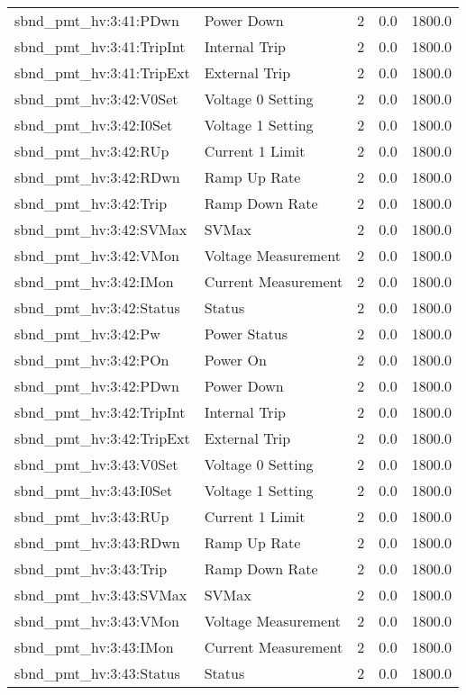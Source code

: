 \begin{center}
\begin{longtable}{l | l l l l }
sbnd\_pmt\_hv:3:41:PDwn & Power Down & 2 & 0.0 & 1800.0\\ 
sbnd\_pmt\_hv:3:41:TripInt & Internal Trip & 2 & 0.0 & 1800.0\\ 
sbnd\_pmt\_hv:3:41:TripExt & External Trip & 2 & 0.0 & 1800.0\\ 
sbnd\_pmt\_hv:3:42:V0Set & Voltage 0 Setting & 2 & 0.0 & 1800.0\\ 
sbnd\_pmt\_hv:3:42:I0Set & Voltage 1 Setting & 2 & 0.0 & 1800.0\\ 
sbnd\_pmt\_hv:3:42:RUp & Current 1 Limit & 2 & 0.0 & 1800.0\\ 
sbnd\_pmt\_hv:3:42:RDwn & Ramp Up Rate & 2 & 0.0 & 1800.0\\ 
sbnd\_pmt\_hv:3:42:Trip & Ramp Down Rate & 2 & 0.0 & 1800.0\\ 
sbnd\_pmt\_hv:3:42:SVMax & SVMax & 2 & 0.0 & 1800.0\\ 
sbnd\_pmt\_hv:3:42:VMon & Voltage Measurement & 2 & 0.0 & 1800.0\\ 
sbnd\_pmt\_hv:3:42:IMon & Current Measurement & 2 & 0.0 & 1800.0\\ 
sbnd\_pmt\_hv:3:42:Status & Status & 2 & 0.0 & 1800.0\\ 
sbnd\_pmt\_hv:3:42:Pw & Power Status & 2 & 0.0 & 1800.0\\ 
sbnd\_pmt\_hv:3:42:POn & Power On & 2 & 0.0 & 1800.0\\ 
sbnd\_pmt\_hv:3:42:PDwn & Power Down & 2 & 0.0 & 1800.0\\ 
sbnd\_pmt\_hv:3:42:TripInt & Internal Trip & 2 & 0.0 & 1800.0\\ 
sbnd\_pmt\_hv:3:42:TripExt & External Trip & 2 & 0.0 & 1800.0\\ 
sbnd\_pmt\_hv:3:43:V0Set & Voltage 0 Setting & 2 & 0.0 & 1800.0\\ 
sbnd\_pmt\_hv:3:43:I0Set & Voltage 1 Setting & 2 & 0.0 & 1800.0\\ 
sbnd\_pmt\_hv:3:43:RUp & Current 1 Limit & 2 & 0.0 & 1800.0\\ 
sbnd\_pmt\_hv:3:43:RDwn & Ramp Up Rate & 2 & 0.0 & 1800.0\\ 
sbnd\_pmt\_hv:3:43:Trip & Ramp Down Rate & 2 & 0.0 & 1800.0\\ 
sbnd\_pmt\_hv:3:43:SVMax & SVMax & 2 & 0.0 & 1800.0\\ 
sbnd\_pmt\_hv:3:43:VMon & Voltage Measurement & 2 & 0.0 & 1800.0\\ 
sbnd\_pmt\_hv:3:43:IMon & Current Measurement & 2 & 0.0 & 1800.0\\ 
sbnd\_pmt\_hv:3:43:Status & Status & 2 & 0.0 & 1800.0\\ 

\end{longtable}
\end{center}
